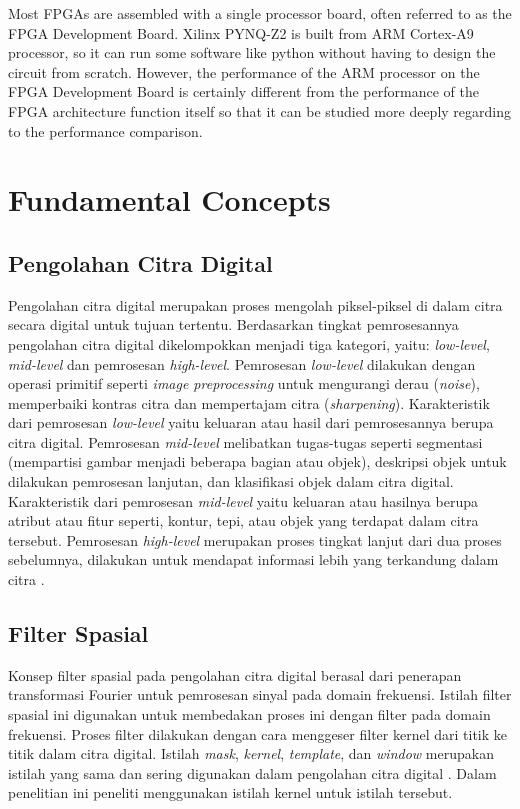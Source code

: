 Most FPGAs are assembled with a single processor board, often referred to as the FPGA Development Board. Xilinx PYNQ-Z2 is built from ARM Cortex-A9 processor, so it can run some software like python without having to design the circuit from scratch. However, the performance of the ARM processor on the FPGA Development Board is certainly different from the performance of the FPGA architecture function itself so that it can be studied more deeply regarding to the performance comparison.


\section{Fundamental Concepts}

\subsection{Pengolahan Citra Digital}
Pengolahan citra digital merupakan proses mengolah piksel-piksel di dalam citra secara digital untuk tujuan tertentu. Berdasarkan tingkat pemrosesannya pengolahan citra digital dikelompokkan menjadi tiga kategori, yaitu: \textit{low-level}, \textit{mid-level} dan pemrosesan \textit{high-level}. Pemrosesan \textit{low-level} dilakukan dengan operasi primitif seperti \textit{image preprocessing} untuk mengurangi derau (\textit{noise}), memperbaiki kontras citra dan mempertajam citra (\textit{sharpening}). Karakteristik dari pemrosesan \textit{low-level} yaitu keluaran atau hasil dari pemrosesannya berupa citra digital. Pemrosesan \textit{mid-level} melibatkan tugas-tugas seperti segmentasi (mempartisi gambar menjadi beberapa bagian atau objek), deskripsi objek untuk dilakukan pemrosesan lanjutan, dan klasifikasi objek dalam citra digital. Karakteristik dari pemrosesan \textit{mid-level} yaitu keluaran atau hasilnya berupa atribut atau fitur seperti, kontur, tepi, atau objek yang terdapat dalam citra tersebut. Pemrosesan \textit{high-level} merupakan proses tingkat lanjut dari dua proses sebelumnya, dilakukan untuk mendapat informasi lebih yang terkandung dalam citra \cite{book:gonzalez}.


\subsection{Filter Spasial}
Konsep filter spasial pada pengolahan citra digital berasal dari penerapan transformasi Fourier untuk pemrosesan sinyal pada domain frekuensi. Istilah filter spasial ini digunakan untuk membedakan proses ini dengan filter pada domain frekuensi. Proses filter dilakukan dengan cara menggeser filter kernel dari titik ke titik dalam citra digital. Istilah \textit{mask}, \textit{kernel}, \textit{template}, dan \textit{window} merupakan istilah yang sama dan sering digunakan dalam pengolahan citra digital \cite{book:gonzalez}. Dalam penelitian ini peneliti menggunakan istilah kernel untuk istilah tersebut.


